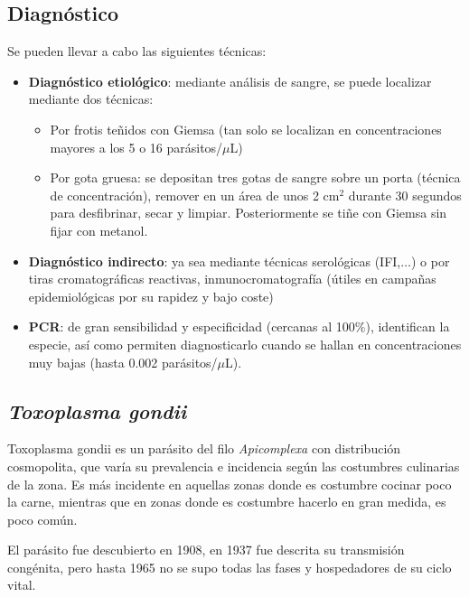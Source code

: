 \subsection{Diagnóstico}
Se pueden llevar a cabo las siguientes técnicas:
\begin{itemize}[itemsep=0pt,parsep=0pt,topsep=0pt,partopsep=0pt]
	\item \textbf{Diagnóstico etiológico}: mediante análisis de sangre, se puede localizar mediante dos técnicas:
	\begin{itemize}
		\item Por frotis teñidos con Giemsa (tan solo se localizan en concentraciones mayores a los 5 o 16 parásitos/$\mu$L)
		\item Por gota gruesa: se depositan tres gotas de sangre sobre un porta (técnica de concentración), remover en un área de unos 2 cm$^2$ durante 30 segundos para desfibrinar, secar y limpiar. Posteriormente se tiñe con Giemsa sin fijar con metanol.
	\end{itemize}
	\item \textbf{Diagnóstico indirecto}: ya sea mediante técnicas serológicas (IFI,$\dots$) o por tiras cromatográficas reactivas, inmunocromatografía (útiles en campañas epidemiológicas por su rapidez y bajo coste)
	\item \textbf{PCR}: de gran sensibilidad y especificidad (cercanas al 100\%), identifican la especie, así como permiten diagnosticarlo cuando se hallan en concentraciones muy bajas (hasta 0.002 parásitos/$\mu$L).
\end{itemize}
\newpage
\subsection{\textit{Toxoplasma gondii}}
Toxoplasma gondii es un parásito del filo \textit{Apicomplexa} con distribución cosmopolita, que varía su prevalencia e incidencia según las costumbres culinarias de la zona. Es más incidente en aquellas zonas donde es costumbre cocinar poco la carne, mientras que en zonas donde es costumbre hacerlo en gran medida, es poco común.

El parásito fue descubierto en 1908, en 1937 fue descrita su transmisión congénita, pero hasta 1965 no se supo todas las fases y hospedadores de su ciclo vital.
